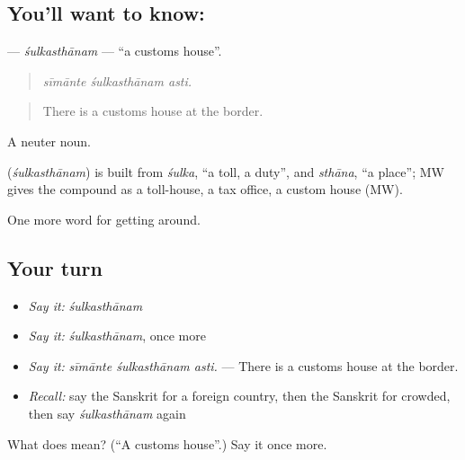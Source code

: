 \subsection*{You'll want to know: }
\textbf{} — \emph{śulkasthānam} — \textquotedblleft{}a customs house\textquotedblright{}.

\begin{quote}
  
\end{quote}

\begin{quote}
\emph{sīmānte śulkasthānam asti.}
\end{quote}

\begin{quote}
There is a customs house at the border.
\end{quote}

A neuter noun.

\begin{cousinweb}
\textbf{} (\emph{śulkasthānam}) is built from \emph{śulka}, \textquotedblleft{}a toll, a duty\textquotedblright{}, and \emph{sthāna}, \textquotedblleft{}a place\textquotedblright{}; MW gives the compound as a toll-house, a tax office, a custom house (MW).
\end{cousinweb}

\begin{grammarlens}[title={What you've built}]
One more word for getting around.
\end{grammarlens}

\subsection*{Your turn}
\begin{itemize}
\raggedright
  \item \emph{Say it:} \emph{śulkasthānam}
  \item \emph{Say it:} \emph{śulkasthānam}, once more
  \item \emph{Say it:} \emph{sīmānte śulkasthānam asti.} — There is a customs house at the border.
  \item \emph{Recall:} say the Sanskrit for a foreign country, then the Sanskrit for crowded, then say \emph{śulkasthānam} again
\end{itemize}

\begin{tcolorbox}[breakable,colback=teal!4,colframe=teal!35!black,title={Before you move on}]
What does  mean? (\textquotedblleft{}A customs house\textquotedblright{}.) Say it once more.
\end{tcolorbox}
